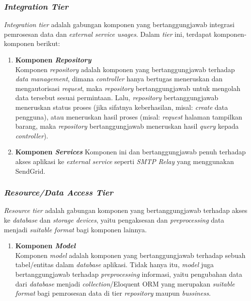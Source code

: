 			
	\subsubsection{\textit{Integration Tier}}
	\textit{Integration tier} adalah gabungan komponen yang bertanggungjawab integrasi pemrosesan data dan \textit{external service usages}. Dalam \textit{tier} ini, terdapat komponen-komponen berikut:
	\begin{enumerate}
		\item \textbf{Komponen \textit{Repository}} \\
		Komponen \textit{repository} adalah komponen yang bertanggungjawab terhadap \textit{data management}, dimana \textit{controller} hanya bertugas meneruskan dan mengautorisasi \textit{request}, maka \textit{repository} bertanggungjawab untuk mengolah data tersebut sesuai permintaan. Lalu, \textit{repository} bertanggungjawab meneruskan status proses (jika sifatnya keberhasilan, misal: \textit{create} data pengguna), atau meneruskan hasil proses (misal: \textit{request} halaman tampilkan barang, maka \textit{repository} bertanggungjawab meneruskan hasil \textit{query} kepada \textit{controller}). \\
		\item \textbf{Komponen \textit{Services}}
		Komponen ini dan bertanggungjawab penuh terhadap akses aplikasi ke \textit{external service} seperti \textit{SMTP Relay} yang menggunakan SendGrid.
	\end{enumerate}

	\subsubsection{\textit{Resource/Data Access Tier}}
	\textit{Resource tier} adalah gabungan komponen yang bertanggungjawab terhadap akses ke \textit{database} dan \textit{storage devices}, yaitu pengaksesan dan \textit{preprocessing} data menjadi \textit{suitable format} bagi komponen lainnya.
	\begin{enumerate}
		\item \textbf{Komponen \textit{Model}} \\
		Komponen \textit{model} adalah komponen yang bertanggungjawab terhadap sebuah tabel/entitas dalam \textit{database} aplikasi. Tidak hanya itu, \textit{model} juga bertanggungjawab terhadap \textit{preprocessing} informasi, yaitu pengubahan data dari \textit{database} menjadi \textit{collection}/Eloquent ORM yang merupakan \textit{suitable format} bagi pemrosesan data di tier \textit{repository} maupun \textit{bussiness}.
	\end{enumerate}		
		
	\newpage
	

	
	
	